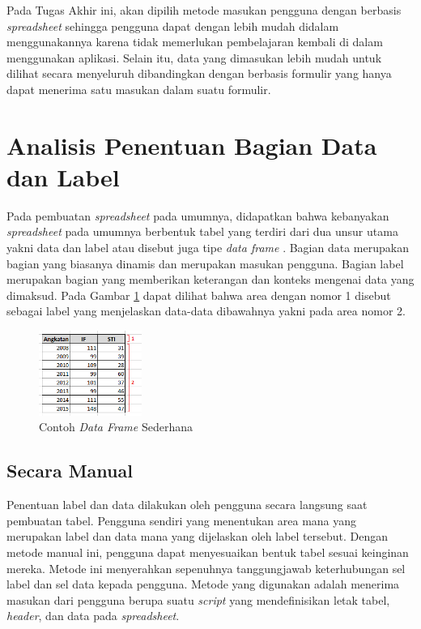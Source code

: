   	Pada Tugas Akhir ini, akan dipilih metode masukan pengguna dengan berbasis \textit{spreadsheet} sehingga pengguna dapat dengan lebih mudah didalam menggunakannya karena tidak memerlukan pembelajaran kembali di dalam menggunakan aplikasi. Selain itu, data yang dimasukan lebih mudah untuk dilihat secara menyeluruh dibandingkan dengan berbasis formulir yang hanya dapat menerima satu masukan dalam suatu formulir.

\section{Analisis Penentuan Bagian Data dan Label}
Pada pembuatan \textit{spreadsheet} pada umumnya, didapatkan bahwa kebanyakan \textit{spreadsheet} pada umumnya berbentuk tabel yang terdiri dari dua unsur utama yakni data dan label atau disebut juga tipe \textit{data frame} \citep{Chen2013}. Bagian data merupakan bagian yang biasanya dinamis dan merupakan masukan pengguna. Bagian label merupakan bagian yang memberikan keterangan dan konteks mengenai data yang dimaksud. Pada Gambar \ref{DataFrameSederhana} dapat dilihat bahwa area dengan nomor 1 disebut sebagai label yang menjelaskan data-data dibawahnya yakni pada area nomor 2.

\begin{figure}[htb]
    \centering
    \includegraphics[width=0.3\textwidth]{resources/chapter-3-simple-dataframe.png}
    \caption{Contoh \textit{Data Frame} Sederhana}
	\label{DataFrameSederhana}
\end{figure}

	\subsection{Secara Manual}
	Penentuan label dan data dilakukan oleh pengguna secara langsung saat pembuatan tabel. Pengguna sendiri yang menentukan area mana yang merupakan label dan data mana yang dijelaskan oleh label tersebut. Dengan metode manual ini, pengguna dapat menyesuaikan bentuk tabel sesuai keinginan mereka. Metode ini menyerahkan sepenuhnya tanggungjawab keterhubungan sel label dan sel data kepada pengguna. Metode yang digunakan adalah menerima masukan dari pengguna berupa suatu \textit{script} yang mendefinisikan letak tabel, \textit{header}, dan data pada \textit{spreadsheet}.


